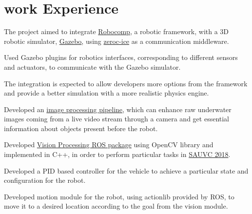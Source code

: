 \documentclass[]{deedy-resume-openfont}
\begin{document}
\begin{minipage}[t]{0.66\textwidth} 


\section{work Experience}

\vspace{\topsep} %
\begin{tightemize}
\item The project aimed to integrate \href{https://robocomp.github.io/web/}{Robocomp}, a robotic framework, with a 3D robotic simulator, \href{http://gazebosim.org}{Gazebo}, using \href{https://doc.zeroc.com/ice/3.6/}{zeroc-ice} as a communication middleware.
\item Used Gazebo plugins for robotics interfaces, corresponding to different sensors and actuators, to communicate with the Gazebo simulator.
\item The integration is expected to allow developers more options from the framework and provide a better simulation with a more realistic physics engine.
\end{tightemize}
\sectionsep

\begin{tightemize}
\item Developed an \href{https://github.com/ksakash/auv2017-1/blob/IP/task_handler_layer/ip.md}{image processing pipeline}, which can enhance raw underwater images coming from a live video stream through a camera and get essential information about objects present before the robot. 
\item Developed \href{https://github.com/ksakash/IP_SAUVC/}{Vision Processing ROS package} using OpenCV library and implemented in C++, in order to perform particular tasks in \href{https://sauvc.org/}{SAUVC 2018}.  
\item Developed a PID based controller for the vehicle to achieve a particular state and configuration for the robot.
\item Developed motion module for the robot, using actionlib provided by ROS, to move it to a desired location according to the goal from the vision module.
\end{tightemize}
\sectionsep


\end{minipage}
\end{document}
